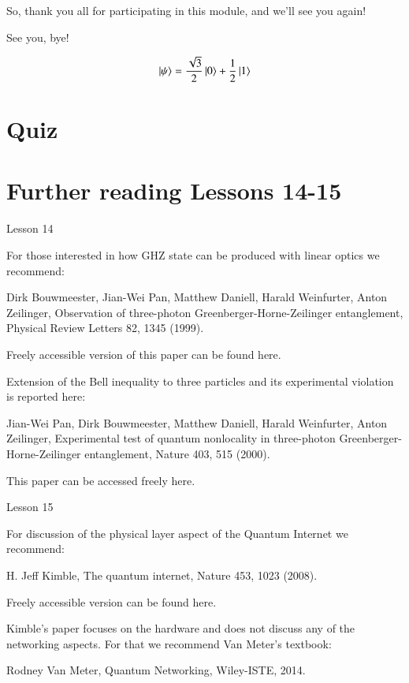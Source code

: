 So, thank you all for participating in this module, and we'll see you again!

See you, bye!




\newpage
\begin{exercises}
\begin{equation*}
\ket{\psi} = \frac{\sqrt{3}}{2}\ket{0} + \frac{1}{2}\ket{1}
\end{equation*}


\end{exercises}


\newpage
\section*{Quiz}


\section*{Further reading Lessons 14-15}

Lesson 14

For those interested in how GHZ state can be produced with linear optics we recommend:

Dirk Bouwmeester, Jian-Wei Pan, Matthew Daniell, Harald Weinfurter, Anton Zeilinger, Observation of three-photon Greenberger-Horne-Zeilinger entanglement, Physical Review Letters 82, 1345 (1999).

Freely accessible version of this paper can be found here.

Extension of the Bell inequality to three particles and its experimental violation is reported here:

Jian-Wei Pan, Dirk Bouwmeester, Matthew Daniell, Harald Weinfurter, Anton Zeilinger, Experimental test of quantum nonlocality in three-photon Greenberger-Horne-Zeilinger entanglement, Nature 403, 515 (2000).

This paper can be accessed freely here.

Lesson 15

For discussion of the physical layer aspect of the Quantum Internet we recommend:

H. Jeff Kimble, The quantum internet, Nature 453, 1023 (2008).

Freely accessible version can be found here.

Kimble’s paper focuses on the hardware and does not discuss any of the networking aspects. For that we recommend Van Meter’s textbook:

Rodney Van Meter, Quantum Networking, Wiley-ISTE, 2014.

